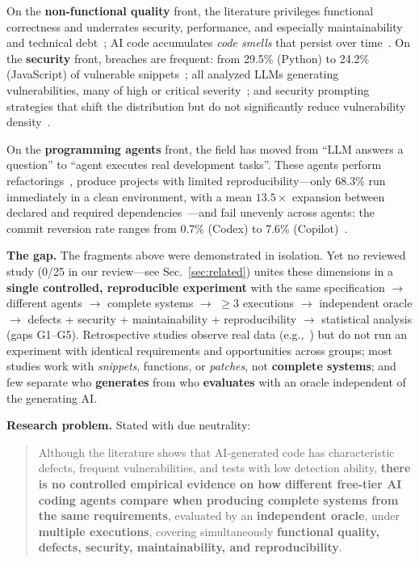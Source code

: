 \documentclass[11pt]{article}
\begin{document}
On the \textbf{non-functional quality} front, the literature privileges functional correctness and underrates security, performance, and especially maintainability and technical debt~\cite{D04}; AI code accumulates \emph{code smells} that persist over time~\cite{D05}. On the \textbf{security} front, breaches are frequent: from 29.5\% (Python) to 24.2\% (JavaScript) of vulnerable snippets~\cite{E01}; all analyzed LLMs generating vulnerabilities, many of high or critical severity~\cite{E02}; and security prompting strategies that shift the distribution but do not significantly reduce vulnerability density~\cite{E03}.

On the \textbf{programming agents} front, the field has moved from ``LLM answers a question'' to ``agent executes real development tasks''. These agents perform refactorings~\cite{F01}, produce projects with limited reproducibility---only 68.3\% run immediately in a clean environment, with a mean $13.5\times$ expansion between declared and required dependencies~\cite{F02}---and fail unevenly across agents: the commit reversion rate ranges from 0.7\% (Codex) to 7.6\% (Copilot)~\cite{F05}.

\textbf{The gap.} The fragments above were demonstrated in isolation. Yet no reviewed study (0/25 in our review---see Sec.~\ref{sec:related}) unites these dimensions in a \textbf{single controlled, reproducible experiment} with the same specification $\rightarrow$ different agents $\rightarrow$ complete systems $\rightarrow$ $\geq$3 executions $\rightarrow$ independent oracle $\rightarrow$ defects + security + maintainability + reproducibility $\rightarrow$ statistical analysis (gaps G1--G5). Retrospective studies observe real data (e.g.,~\cite{D05,F04,F05}) but do not run an experiment with identical requirements and opportunities across groups; most studies work with \emph{snippets}, functions, or \emph{patches}, not \textbf{complete systems}; and few separate who \textbf{generates} from who \textbf{evaluates} with an oracle independent of the generating AI.

\textbf{Research problem.} Stated with due neutrality:

\begin{quote}
Although the literature shows that AI-generated code has characteristic defects, frequent vulnerabilities, and tests with low detection ability, \textbf{there is no controlled empirical evidence on how different free-tier AI coding agents compare when producing complete systems from the same requirements}, evaluated by an \textbf{independent oracle}, under \textbf{multiple executions}, covering simultaneously \textbf{functional quality, defects, security, maintainability, and reproducibility}.
\end{quote}
\end{document}
